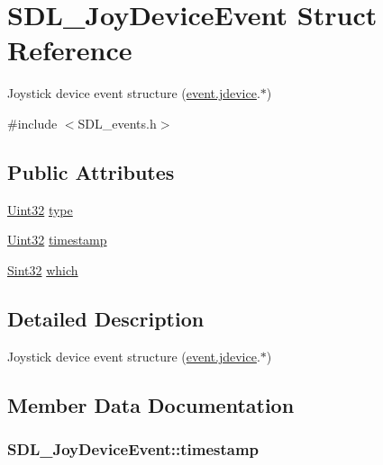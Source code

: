 \hypertarget{struct_s_d_l___joy_device_event}{}\section{S\+D\+L\+\_\+\+Joy\+Device\+Event Struct Reference}
\label{struct_s_d_l___joy_device_event}


Joystick device event structure (\hyperlink{union_s_d_l___event_a17514dc19a846ea1b5fbe44123700c4c}{event.\+jdevice}.$\ast$)  




{\ttfamily \#include $<$S\+D\+L\+\_\+events.\+h$>$}

\subsection*{Public Attributes}
\begin{DoxyCompactItemize}
\item 
\hyperlink{_s_d_l__stdinc_8h_add440eff171ea5f55cb00c4a9ab8672d}{Uint32} \hyperlink{struct_s_d_l___joy_device_event_a51f060ba1dd5669b458e9c97aece667e}{type}
\item 
\hyperlink{_s_d_l__stdinc_8h_add440eff171ea5f55cb00c4a9ab8672d}{Uint32} \hyperlink{struct_s_d_l___joy_device_event_a5c4a9271bfff5d5c2e09a0dc732df8f3}{timestamp}
\item 
\hyperlink{_s_d_l__stdinc_8h_a7a90b941db9d4582e9ad7abb9940ff7e}{Sint32} \hyperlink{struct_s_d_l___joy_device_event_af9b295798f033b799ebbda7de6cb5a7e}{which}
\end{DoxyCompactItemize}


\subsection{Detailed Description}
Joystick device event structure (\hyperlink{union_s_d_l___event_a17514dc19a846ea1b5fbe44123700c4c}{event.\+jdevice}.$\ast$) 

\subsection{Member Data Documentation}
\subsubsection[{\texorpdfstring{timestamp}{timestamp}}]{ S\+D\+L\+\_\+\+Joy\+Device\+Event\+::timestamp}\hypertarget{struct_s_d_l___joy_device_event_a5c4a9271bfff5d5c2e09a0dc732df8f3}{}\label{struct_s_d_l___joy_device_event_a5c4a9271bfff5d5c2e09a0dc732df8f3}
